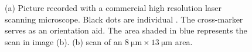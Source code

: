			\begin{figure}[!htb]
				\begin{subfigure}{ 0.49\linewidth}
					\centering
					\caption{}
					\label{subfig::cross_laser_scan}
				\end{subfigure}
				\hfill
				\begin{subfigure}{ 0.49\linewidth}
					\centering
					\caption{}
					\label{subfig::pp_pl_scan}
				\end{subfigure}
				\caption[Localizing suitable \nds]{(a) Picture recorded with a commercial high resolution laser scanning microscope. Black dots are individual \nds. The cross-marker serves as an orientation aid. The area shaded in blue represents the \pl scan in image (b). (b) \Pl scan of an
				$\SI{8}{\micro\metre} \times \SI{13}{\micro\metre}$ area.}
			\end{figure}

